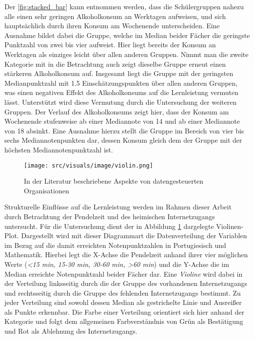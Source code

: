 Der \ref*{fig:stacked_bar} kann entnommen werden, dass die Schülergruppen nahezu alle einen sehr geringen Alkoholkonsum an Werktagen aufweisen, und sich hauptsächlich durch ihren Konsum am Wochenende unterscheiden.
Eine Ausnahme bildet dabei die Gruppe, welche im Median beider Fächer die geringste Punktzahl von zwei bis vier aufweist. 
Hier liegt bereits der Konsum an Werktagen als einziges leicht über allen anderen Gruppen.
Nimmt man die zweite Kategorie mit in die Betrachtung auch zeigt dieselbe Gruppe erneut einen stärkeren Alkoholkonsum auf.
Insgesamt liegt die Gruppe mit der geringsten Medianpunktzahl mit 1.5 Einschätzungspunkten über allen anderen Gruppen, was einen negativen Effekt des Alkoholkonsums auf die Lernleistung vermuten lässt.
Unterstützt wird diese Vermutung durch die Untersuchung der weiteren Gruppen. 
Der Verlauf des Alkoholkonsums zeigt hier, dass der Konsum am Wochenende stufenweise ab einer Mediannote von 14 und ab einer Mediannote von 18 absinkt. 
Eine Ausnahme hierzu stellt die Gruppe im Bereich von vier bis sechs Mediannotenpunkten dar, dessen Konsum gleich dem der Gruppe mit der höchsten Mediannotenpunktzahl ist.

\begin{figure}[htb]
    \centering
    \texttt{[image: src/visuals/image/violin.png]}
    \caption{In der Literatur beschriebene Aspekte von datengesteuerten Organisationen}
    \label{fig:violin}
\end{figure}

Strukturelle Einflüsse auf die Lernleistung werden im Rahmen dieser Arbeit durch Betrachtung der Pendelzeit und des heimischen Internetzugangs untersucht.
Für die Untersuchung dient der in Abbildung \ref{fig:violin} dargelegte Violinen-Plot.
Dargestellt wird mit dieser Diagrammart die Datenverteilung der Variablen im Bezug auf die damit erreichten Notenpunktzahlen in Portugiesisch und Mathematik.
Hierbei legt die X-Achse die Pendelzeit anhand ihrer vier möglichen Werte (\textit{<15 min, 15-30 min, 30-60 min, >60 min}) und die Y-Achse die im Median erreichte Notenpunktzahl beider Fächer dar.
Eine \textit{Violine} wird dabei in der Verteilung linksseitig durch die der Gruppe des vorhandenen Internetzugangs und rechtsseitig durch die Gruppe des fehlenden Internetzugangs bestimmt.
Zu jeder Verteilung sind sowohl dessen Median als gestrichelte Linie und Ausreißer als Punkte erkennbar.
Die Farbe einer Verteilung orientiert sich hier anhand der Kategorie und folgt dem allgemeinen Farbverständnis von Grün als Bestätigung und Rot als Ablehnung des Internetzugangs.

